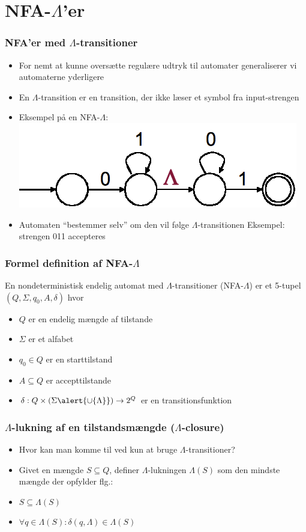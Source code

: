 \section{NFA-$\Lambda$’er}
\begin{frame}
  \frametitle{NFA'er med $\Lambda$-transitioner}
\begin{itemize}[<+->]
\item For nemt at kunne oversætte regulære udtryk til automater
  generaliserer vi automaterne yderligere
\item En $\Lambda$-transition er en transition, der ikke læser et
  symbol fra input-strengen
\item Eksempel på en NFA-$\Lambda$:
\includegraphics[scale=0.4]{images/2_seminar_nfalambda}
\item Automaten “bestemmer selv” om den vil følge 
$\Lambda$-transitionen
Eksempel: strengen 011 accepteres
\end{itemize}
\end{frame}
\begin{frame}
\frametitle{Formel definition af NFA-$\Lambda$}
En nondeterministisk endelig automat 
med $\Lambda$-transitioner (NFA-$\Lambda$) er 
et 5-tupel $(Q, \Sigma, q_0, A, \delta)$ hvor

\begin{itemize}[<+->]
\item $Q$ er en endelig mængde af tilstande
\item $\Sigma$ er et alfabet
\item $q_0\in Q$ er en starttilstand
\item $A\subseteq Q$ er accepttilstande
\item $\delta: Q\times (\Sigma \alert{\cup \{\Lambda}\})\rightarrow 2^Q$ er en
  transitionsfunktion
\end{itemize}
\end{frame}
\begin{frame}
\frametitle{$\Lambda$-lukning af en tilstandsmængde ($\Lambda$-closure)}
\begin{itemize}[<+->]
\item Hvor kan man komme til ved kun at bruge 
$\Lambda$-transitioner?
\item Givet en mængde $S\subseteq Q$, definer $\Lambda$-lukningen
  $\Lambda(S)$ som den mindste mængde der opfylder flg.: 
\item $S \subseteq \Lambda(S)$
\item $\forall q\in \Lambda(S): \delta(q, \Lambda) \in \Lambda(S)$
\end{itemize}
\end{frame}

